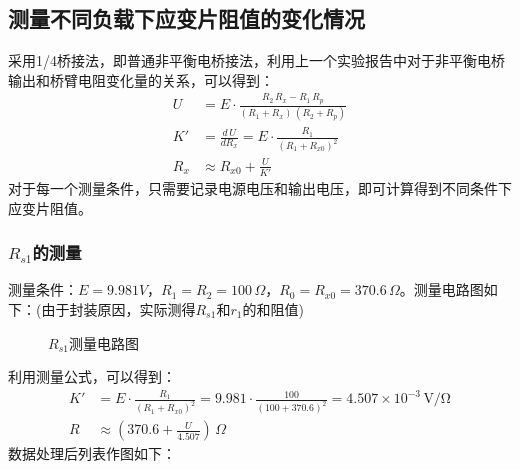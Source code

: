 \documentclass[12pt]{article}
\begin{document}
\subsection{测量不同负载下应变片阻值的变化情况}
\quad 采用1/4桥接法，即普通非平衡电桥接法，利用上一个实验报告中对于非平衡电桥输出和桥臂电阻变化量的关系，可以得到：
\[
\begin{aligned}
  U &= E\cdot\frac{R_2\,R_x-R_1\,R_p}{(R_1+R_x)\,(R_2+R_p)} \\
  K'&=\frac{d\,U}{dR_x} = E \cdot \frac{R_1}{(R_1+R_{x0})^2} \\
  R_x &\approx R_{x0}+\frac {U}{K'} 
\end{aligned}
\]
\quad 对于每一个测量条件，只需要记录电源电压和输出电压，即可计算得到不同条件下应变片阻值。
\subsubsection{$R_{s1}$的测量}
\quad 测量条件：$E=9.981V$，$R_1=R_2=100\,\Omega$，$R_0=R_{x0}=370.6\,\Omega$。测量电路图如下：(由于封装原因，实际测得$R_{s1}$和$r_1$的和阻值)
\begin{figure}[H]
  \centering
  \caption{$R_{s1}$测量电路图}
  \label{fig:rs1}
\end{figure}
\par 
利用测量公式，可以得到：
\[
\begin{aligned}
  K'&= E \cdot \frac{R_1}{(R_1+R_{x0})^2}=9.981\cdot\frac{100}{(100+370.6)^2}=4.507\times10^{-3}\,\text{V/Ω}\\
  R &\approx (370.6+\frac {U}{4.507})\,\Omega
\end{aligned}
\]
\quad 数据处理后列表作图如下：
\end{document}
